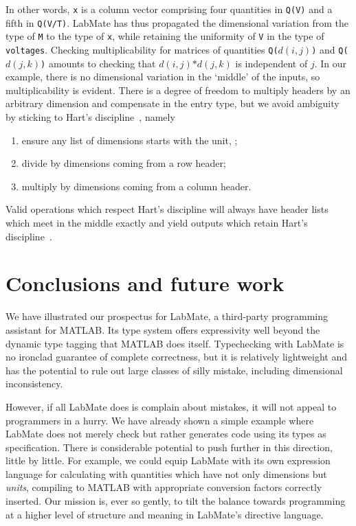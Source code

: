 \documentclass{IMEKO2024}
\newcommand{\lcb}{\texttt{\symbol{123}}}
\newcommand{\rcb}{\texttt{\symbol{125}}}
\newcommand{\remph}{\emph}
\begin{document}
In other words, \texttt{x} is a column vector comprising four quantities in \texttt{Q(V)} and a fifth in \texttt{Q(V/T)}.
LabMate has thus propagated the dimensional variation from the type of \texttt{M} to the type of \texttt{x}, while retaining the uniformity of \texttt{V} in the type of \texttt{voltages}. Checking multiplicability for matrices of quantities \texttt{Q(}$d(i,j)$\texttt{)} and
\texttt{Q(}$d(j,k)$\texttt{)} amounts to checking that $d(i,j)\texttt{*}d(j,k)$ is independent of $j$. In our example, there is no dimensional variation in the `middle' of the inputs, so multiplicability is evident. There is a degree of freedom to multiply headers by an arbitrary dimension and compensate in the entry type, but we avoid ambiguity by sticking to Hart's discipline~\cite{hart}, namely
\begin{enumerate}
\item ensure any list of dimensions starts with the unit, \lcb\rcb;
\item divide by dimensions coming from a row header;
\item multiply by dimensions coming from a column header.
\end{enumerate}
Valid operations which respect Hart's discipline will always have header lists which meet in the middle exactly and yield outputs which retain Hart's discipline~\cite{dimTypes}.



\section{Conclusions and future work}

We have illustrated our prospectus for LabMate, a third-party programming assistant for MATLAB.
%
Its type system offers expressivity well beyond the dynamic type tagging that MATLAB does itself.
%
Typechecking with LabMate is no ironclad guarantee of complete correctness, but it is relatively lightweight and has the potential to rule out large classes of silly mistake, including dimensional inconsistency.

However, if all LabMate does is complain about mistakes, it will not appeal to programmers in a hurry.
%
We have already shown a simple example where LabMate does not merely check but rather generates code using its types as specification.
%
There is considerable potential to push further in this direction, little by little.
%
For example, we could equip LabMate with its own expression language for calculating with quantities which have not only dimensions but \remph{units}, compiling to MATLAB with appropriate conversion factors correctly inserted.
%
Our mission is, ever so gently, to tilt the balance towards programming at a higher level of structure and meaning in LabMate's directive language.
\end{document}
